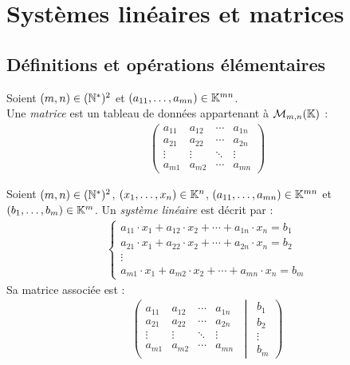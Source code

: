\chapter{Systèmes linéaires et matrices}
\def\arraystretch{1}

\section{Définitions et opérations élémentaires}
\begin{definition}[Matrice]
	Soient $(m,n) \in (\mathbb{N}^*)^2$ et $(a_{11}, \ldots, a_{mn}) \in \mathbb{K}^{mn}$. \\
    Une \emph{matrice} est un tableau de données appartenant à $\mathcal{M}_{m,n} (\mathbb{K})$ :
    \begin{align*}
        \begin{pmatrix}
            a_{11} & a_{12} & \cdots & a_{1n} \\
            a_{21} & a_{22} & \cdots & a_{2n} \\
            \vdots & \vdots & \ddots & \vdots \\
            a_{m1} & a_{m2} & \cdots & a_{mn}
        \end{pmatrix}
    \end{align*}
\end{definition}

\begin{definition}
    Soient $(m,n) \in (\mathbb{N}^*)^2$, $(x_1, \ldots, x_n) \in \mathbb{K}^n$, $(a_{11}, \ldots, a_{mn}) \in \mathbb{K}^{mn}$ et $(b_1, \ldots, b_m) \in \mathbb{K}^m$.
    Un \emph{système linéaire} est décrit par :
    \begin{align*}
        \begin{cases}
            a_{11} \cdot x_1 + a_{12} \cdot x_2 + \cdots + a_{1n} \cdot x_n = b_1 \\
            a_{21} \cdot x_1 + a_{22} \cdot x_2 + \cdots + a_{2n} \cdot x_n = b_2 \\
            \vdots \\
            a_{m1} \cdot x_1 + a_{m2} \cdot x_2 + \cdots + a_{mn} \cdot x_n = b_m
        \end{cases}
    \end{align*}        
    Sa matrice associée est : 
    \begin{align*}
        \left(
        \begin{matrix}    
            a_{11} & a_{12} & \cdots & a_{1n} \\
            a_{21} & a_{22} & \cdots & a_{2n} \\
            \vdots & \vdots & \ddots & \vdots \\
            a_{m1} & a_{m2} & \cdots & a_{mn}
        \end{matrix}
        \
        \middle|
        \
        \begin{matrix}
            b_1 \\
            b_2 \\
            \vdots \\
            b_m
        \end{matrix}
        \right)
    \end{align*}
\end{definition}

